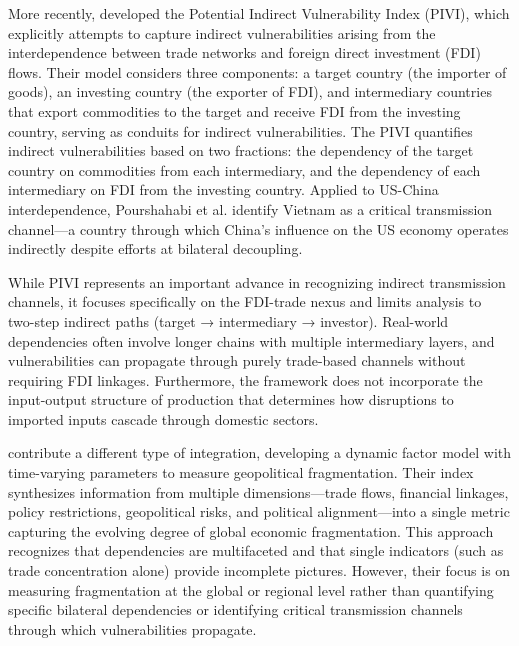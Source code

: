 \documentclass[final,1p,times,authoryear]{elsarticle}
\begin{document}
More recently, \cite{Pourshahabi2024} developed the Potential Indirect Vulnerability Index (PIVI), which explicitly attempts to capture indirect vulnerabilities arising from the interdependence between trade networks and foreign direct investment (FDI) flows. Their model considers three components: a target country (the importer of goods), an investing country (the exporter of FDI), and intermediary countries that export commodities to the target and receive FDI from the investing country, serving as conduits for indirect vulnerabilities. The PIVI quantifies indirect vulnerabilities based on two fractions: the dependency of the target country on commodities from each intermediary, and the dependency of each intermediary on FDI from the investing country. Applied to US-China interdependence, Pourshahabi et al. identify Vietnam as a critical transmission channel—a country through which China's influence on the US economy operates indirectly despite efforts at bilateral decoupling.

While PIVI represents an important advance in recognizing indirect transmission channels, it focuses specifically on the FDI-trade nexus and limits analysis to two-step indirect paths (target → intermediary → investor). Real-world dependencies often involve longer chains with multiple intermediary layers, and vulnerabilities can propagate through purely trade-based channels without requiring FDI linkages. Furthermore, the framework does not incorporate the input-output structure of production that determines how disruptions to imported inputs cascade through domestic sectors.

\cite{FernandezVillaverde2024} contribute a different type of integration, developing a dynamic factor model with time-varying parameters to measure geopolitical fragmentation. Their index synthesizes information from multiple dimensions—trade flows, financial linkages, policy restrictions, geopolitical risks, and political alignment—into a single metric capturing the evolving degree of global economic fragmentation. This approach recognizes that dependencies are multifaceted and that single indicators (such as trade concentration alone) provide incomplete pictures. However, their focus is on measuring fragmentation at the global or regional level rather than quantifying specific bilateral dependencies or identifying critical transmission channels through which vulnerabilities propagate.
\end{document}
